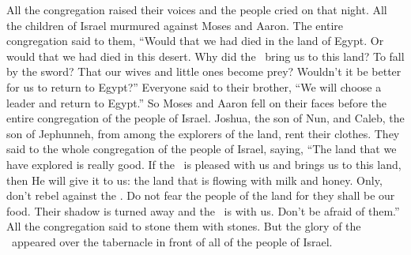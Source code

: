 
\begin{inparaenum}
   All the congregation raised their voices and the people cried on that night.%
   All the children of Israel murmured against Moses and Aaron. The entire congregation said to them, ``Would that we had died in the land of Egypt. Or would that we had died in this desert.%
   Why did the \lord\ bring us to this land? To fall by the sword? That our wives and little ones become prey? Wouldn't it be better for us to return to Egypt?''%
   Everyone said to their brother, ``We will choose a leader and return to Egypt.''%
   So Moses and Aaron fell on their faces before the entire congregation of the people of Israel.%
   Joshua, the son of Nun, and Caleb, the son of Jephunneh, from among the explorers of the land, rent their clothes.%
   They said to the whole congregation of the people of Israel, saying, ``The land that we have explored is really good.%
   If the \lord\ is pleased with us and brings us to this land, then He will give it to us: the land that is flowing with milk and honey.%
   Only, don't rebel against the \lord. Do not fear the people of the land for they shall be our food. Their shadow is turned away and the \lord\ is with us. Don't be afraid of them.''%
   All the congregation said to stone them with stones. But the glory of the \lord\ appeared over the tabernacle in front of all of the people of Israel.%
  

\end{inparaenum}
